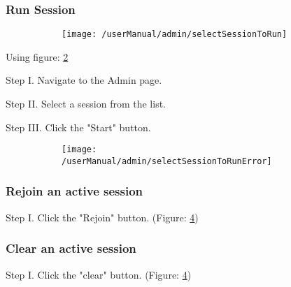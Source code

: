 \subsubsection{Run Session}
\begin{figure}[H]
    \centering
    \begin{subfigure}{\linewidth}
        \texttt{[image: /userManual/admin/selectSessionToRun]}
       	\caption{}
		\label{fig:RunSessionOverview}	
    \end{subfigure}
\end{figure}
Using figure: \ref{fig:RunSessionOverview}
\begin{userManualItemlist}
    \item[Step I.] Navigate to the Admin page.
    \item[Step II.] Select a session from the list.
    \item[Step III.] Click the "Start" button.
\end{userManualItemlist}

\begin{figure}[H]
    \centering
    \begin{subfigure}{\linewidth}
        \texttt{[image: /userManual/admin/selectSessionToRunError]}
       	\caption{}
		\label{fig:RunSessionOverviewError}	
    \end{subfigure}
\end{figure}
\begin{minipage}{0.45\linewidth}
    \subsubsection{Rejoin an active session}
    \begin{userManualItemlist}
        \item[Step I.] Click the "Rejoin" button. (Figure: \ref{fig:RunSessionOverviewError})
    \end{userManualItemlist}
\end{minipage}
\hfill
\begin{minipage}{0.45\linewidth}
    \subsubsection{Clear an active session}
    \begin{userManualItemlist}
        \item[Step I.] Click the "clear" button. (Figure: \ref{fig:RunSessionOverviewError})
    \end{userManualItemlist}
\end{minipage}


